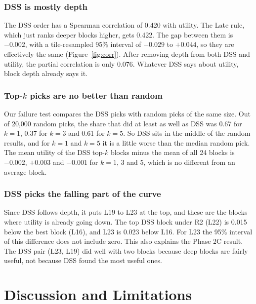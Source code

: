 \documentclass[11pt,a4paper]{report}
\begin{document}
\subsection{DSS is mostly depth}

The DSS order has a Spearman correlation of 0.420 with utility. The Late rule, which just ranks deeper blocks higher, gets 0.422. The gap between them is $-0.002$, with a tile-resampled 95\% interval of $-0.029$ to $+0.044$, so they are effectively the same (Figure~\ref{fig:corr}). After removing depth from both DSS and utility, the partial correlation is only 0.076. Whatever DSS says about utility, block depth already says it.

\subsection{Top-$k$ picks are no better than random}

Our failure test compares the DSS picks with random picks of the same size. Out of 20,000 random picks, the share that did at least as well as DSS was 0.67 for $k = 1$, 0.37 for $k = 3$ and 0.61 for $k = 5$. So DSS sits in the middle of the random results, and for $k = 1$ and $k = 5$ it is a little worse than the median random pick. The mean utility of the DSS top-$k$ blocks minus the mean of all 24 blocks is $-0.002$, $+0.003$ and $-0.001$ for $k = 1$, 3 and 5, which is no different from an average block.

\subsection{DSS picks the falling part of the curve}

Since DSS follows depth, it puts L19 to L23 at the top, and these are the blocks where utility is already going down. The top DSS block under R2 (L22) is 0.015 below the best block (L16), and L23 is 0.023 below L16. For L23 the 95\% interval of this difference does not include zero. This also explains the Phase 2C result. The DSS pair (L23, L19) did well with two blocks because deep blocks are fairly useful, not because DSS found the most useful ones.

\chapter{Discussion and Limitations}
\label{ch:discussion}
\end{document}
